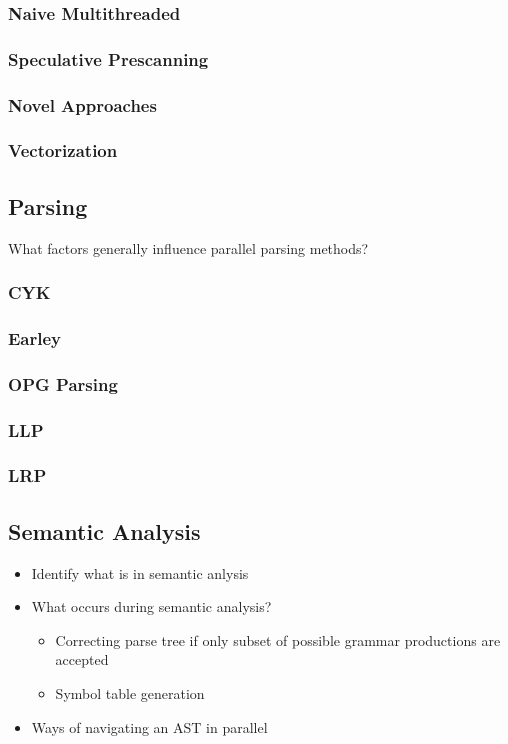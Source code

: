 \subsubsection{Naive Multithreaded}

\subsubsection{Speculative Prescanning}

\subsubsection{Novel Approaches}

\subsubsection{Vectorization}

\subsection{Parsing}
\begin{sectionplan}
    What factors generally influence parallel parsing methods?
\end{sectionplan}

\subsubsection{CYK}
\subsubsection{Earley}
\subsubsection{OPG Parsing}
\subsubsection{LLP}
\subsubsection{LRP}

\subsection{Semantic Analysis}
\begin{sectionplan}
    \begin{itemize}
        \item Identify what is in semantic anlysis
        \item What occurs during semantic analysis?
        \begin{itemize}
            \item Correcting parse tree if only subset of possible grammar productions are accepted
            \item Symbol table generation
        \end{itemize}
        \item Ways of navigating an AST in parallel
    \end{itemize}
\end{sectionplan}
